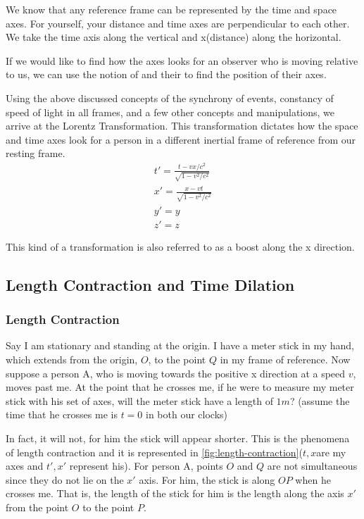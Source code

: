 \documentclass[16pt]{scrartcl}
\numberwithin{equation}{section}
\theoremstyle{plain}
\theoremstyle{definition}
\begin{document}
We know that any reference frame can be represented by the time and space axes. For yourself, your distance and time axes are perpendicular to each other. We take the time axis along the vertical and x(distance) along the horizontal.

If we would like to find how the axes looks for an observer who is moving relative to us, we can use the notion of  and their  to find the position of their axes.

Using the above discussed concepts of the synchrony of events, constancy of speed of light in all frames, and a few other concepts and manipulations, we arrive at the Lorentz Transformation. This transformation dictates how the space and time axes look for a person in a different inertial frame of reference from our resting frame. 
\begin{gather}
    t' = \frac{t-vx/c^2}{\sqrt{1-v^2/c^2}} \\
    x' = \frac{x-vt}{\sqrt{1-v^2/c^2}} \\
    y' = y\\
    z' = z
    \label{eq:lorentz}
\end{gather}

This kind of a transformation is also referred to as a boost along the x direction.

\subsection{Length Contraction and Time Dilation}

\subsubsection*{Length Contraction}
\hspace{\fill}
Say I am stationary and standing at the origin. I have a meter stick in my hand, which extends from the origin, $O$, to the point $Q$ in my frame of reference. Now suppose a person A, who is moving towards the positive x direction at a speed $v$, moves past me. At the point that he crosses me, if he were to measure my meter stick with his set of axes, will the meter stick have a length of $1m$? (assume the time that he crosses me is $t=0$ in both our clocks)

In fact, it will not, for him the stick will appear shorter. This is the phenomena of length contraction and it is represented in \autoref{fig:length-contraction}($t,x$are my axes and $t',x'$ represent his). For person A, points $O$ and $Q$ are not simultaneous since they do not lie on the $x'$ axis. For him, the stick is along $OP$ when he crosses me. That is, the length of the stick for him is the length along the axis $x'$ from the point $O$ to the point $P$. 
\end{document}
